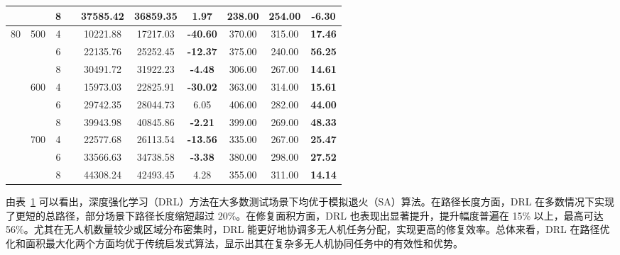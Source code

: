 \documentclass[AutoFakeBold]{LZUThesis}
\begin{document}
\begin{table}[H]
\begin{tabular}{cccc ccc ccc}
							&                      & 8    &  & 37585.42                 & 36859.35                 & 1.97    & 238.00 & 254.00 & -6.30   \\
		\midrule
		\multirow{9}{*}{80} & \multirow{3}{*}{500} & 4    &  & 10221.88                 & 17217.03                 & \textbf{-40.60}  & 370.00 & 315.00 & \textbf{17.46}   \\
							&                      & 6    &  & 22135.76                 & 25252.45                 & \textbf{-12.37}  & 375.00 & 240.00 & \textbf{56.25}   \\
							&                      & 8    &  & 30491.72                 & 31922.23                 & \textbf{-4.48}   & 306.00 & 267.00 & \textbf{14.61}   \\
		\cmidrule(lr){2-10}
							& \multirow{3}{*}{600} & 4    &  & 15973.03                 & 22825.91                 & \textbf{-30.02}  & 363.00 & 314.00 & \textbf{15.61}   \\
							&                      & 6    &  & 29742.35                 & 28044.73                 & 6.05    & 406.00 & 282.00 & \textbf{44.00}   \\
							&                      & 8    &  & 39943.98                 & 40845.86                 & \textbf{-2.21}   & 399.00 & 269.00 & \textbf{48.33}   \\
		\cmidrule(lr){2-10}
							& \multirow{3}{*}{700} & 4    &  & 22577.68                 & 26113.54                 & \textbf{-13.56}  & 335.00 & 267.00 & \textbf{25.47}   \\
							&                      & 6    &  & 33566.63                 & 34738.58                 & \textbf{-3.38}   & 380.00 & 298.00 & \textbf{27.52}   \\
							&                      & 8    &  & 44308.24                 & 42493.45                 & 4.28    & 355.00 & 311.00 & \textbf{14.14}   \\
		\bottomrule
	\end{tabular}
	\label{tab:combined_comparison}
\end{table}

由表~\ref{tab:combined_comparison} 可以看出，深度强化学习（DRL）方法在大多数测试场景下均优于模拟退火（SA）算法。在路径长度方面，DRL 在多数情况下实现了更短的总路径，部分场景下路径长度缩短超过 20\%。在修复面积方面，DRL 也表现出显著提升，提升幅度普遍在 15\% 以上，最高可达 56\%。尤其在无人机数量较少或区域分布密集时，DRL 能更好地协调多无人机任务分配，实现更高的修复效率。总体来看，DRL 在路径优化和面积最大化两个方面均优于传统启发式算法，显示出其在复杂多无人机协同任务中的有效性和优势。
\end{document}
